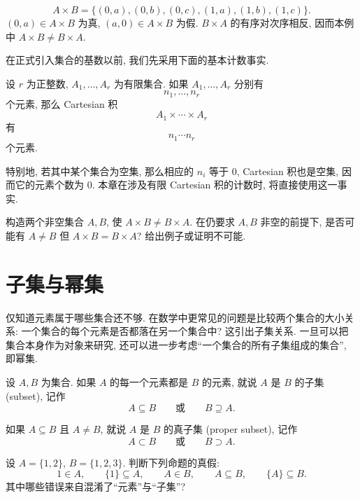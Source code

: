 \documentclass[usesamecnt, thmcnt=section, lang=cn, newtx, 10pt, scheme=chinese]{elegantbook}
\begin{document}
\begin{solution}
\[
 A\times B=\{(0,a),(0,b),(0,c),(1,a),(1,b),(1,c)\}.
\]
$(0,a)\in A\times B$ 为真, $(a,0)\in A\times B$ 为假. $B\times A$ 的有序对次序相反, 因而本例中 $A\times B\neq B\times A$.
\end{solution}

\begin{knowledge}
在正式引入集合的基数以前, 我们先采用下面的基本计数事实.

设 $r$ 为正整数, $A_1,\ldots,A_r$ 为有限集合. 如果 $A_1,\ldots,A_r$ 分别有
\[
 n_1,\ldots,n_r
\]
个元素, 那么 Cartesian 积
\[
 A_1\times\cdots\times A_r
\]
有
\[
 n_1\cdots n_r
\]
个元素.

特别地, 若其中某个集合为空集, 那么相应的 $n_i$ 等于 $0$, Cartesian 积也是空集, 因而它的元素个数为 $0$. 本章在涉及有限 Cartesian 积的计数时, 将直接使用这一事实.
\end{knowledge}

\begin{exercise}\label{ex:sets-cartesian-02}
构造两个非空集合 $A,B$, 使 $A\times B\neq B\times A$. 在仍要求 $A,B$ 非空的前提下, 是否可能有 $A\neq B$ 但 $A\times B=B\times A$? 给出例子或证明不可能.
\end{exercise}

\section{子集与幂集}

仅知道元素属于哪些集合还不够. 在数学中更常见的问题是比较两个集合的大小关系: 一个集合的每个元素是否都落在另一个集合中? 这引出子集关系. 一旦可以把集合本身作为对象来研究, 还可以进一步考虑``一个集合的所有子集组成的集合'', 即幂集.

\begin{definition}\label{def:sets-subset}
设 $A,B$ 为集合. 如果 $A$ 的每一个元素都是 $B$ 的元素, 就说 $A$ 是 $B$ 的{\color{blue}子集 (subset)}, 记作
\[
 A\subseteq B
 \qquad\text{或}\qquad
 B\supseteq A.
\]

如果 $A\subseteq B$ 且 $A\neq B$, 就说 $A$ 是 $B$ 的{\color{blue}真子集 (proper subset)}, 记作
\[
 A\subset B
 \qquad\text{或}\qquad
 B\supset A.
\]
\end{definition}

\begin{concept}\label{con:sets-03}
设 $A=\{1,2\}$, $B=\{1,2,3\}$. 判断下列命题的真假:
\[
 1\in A,\qquad \{1\}\subseteq A,\qquad A\in B,\qquad A\subseteq B,\qquad \{A\}\subseteq B.
\]
其中哪些错误来自混淆了``元素''与``子集''?
\end{concept}
\end{document}

